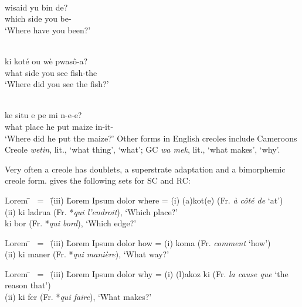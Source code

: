 \ea\label{ex:2:79}
\langinfo{\langGC}{}{}\\
 \gll wisaid yu bin de?\\
{which side} you {\TNS} be-\LOC \\
\glt `Where have you been?'
\z

\ea\label{ex:2:80}
\langinfo{\langHC}{}{}\\
\gll ki koté ou wè pwas{\^o}-a?\\
what side you see fish-the\\
\glt `Where did you see the fish?'
\z

\ea\label{ex:2:81}
\langinfo{\langST}{}{}\\
\gll ke situ e pe mi n-e-e?\\
what place he put maize in-it-\QP\\
\glt `Where did he put the maize?'
\z
Other forms in English creoles include Cameroons Creole \textit{wetin}, lit., `what thing', `what'; GC \textit{wa mek}, lit., `what makes', `why'.

Very often a creole has doublets, a superstrate adaptation and a bimorphemic creole form. \citet[509]{Papen1978} gives the following sets for SC and RC:


\ea\label{ex:2:82} \begin{tabbing}	Lorem \= ~{\rm =}~ \= {\rm (iii)} \= Lorem Ipsum dolor \kill
					where \> {\rm =} \> {\rm (i)} \> (a)kot(e) {\rm (Fr. {\it à côté de} `at')}\\
					\> \> {\rm (ii)} \> ki ladrua {\rm (Fr. *{\it qui l'endroit}), `Which place?'}\\
					\> \> \> ki bor {\rm (Fr. *{\it qui bord}), `Which edge?'}
					\end{tabbing}\z

\ea\label{ex:2:83} \begin{tabbing}	Lorem \= ~{\rm =}~ \= {\rm (iii)} \= Lorem Ipsum dolor \kill
					how \> {\rm =} \> {\rm (i)} \> koma {\rm (Fr. {\it comment} `how')}\\
					\> \> {\rm (ii)} \> ki maner {\rm (Fr. *{\it qui manière}), `What way?'}\end{tabbing}\z

\ea\label{ex:2:84} \begin{tabbing}	Lorem \= ~{\rm =}~ \= {\rm (iii)} \= Lorem Ipsum dolor \kill
					why \> {\rm =} \> {\rm (i)} \> (l)akoz ki {\rm (Fr. {\it la cause que} `the reason that')}\\
					\> \> {\rm (ii)} \> ki fer {\rm (Fr. *{\it qui faire}), `What makes?'}\end{tabbing}\z

